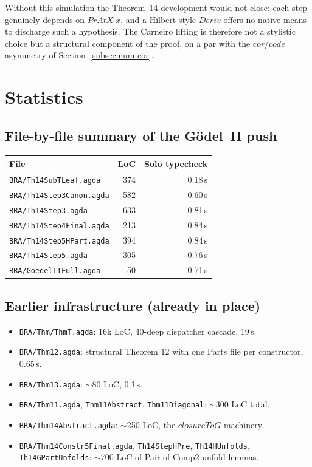 \documentclass[11pt]{article}
\begin{document}
Without this simulation the Theorem~14 development would not close:
each step genuinely depends on $\mathit{PrAtX}\;x$, and a Hilbert-style
$\mathit{Deriv}$ offers no native means to discharge such a hypothesis.
The Carneiro lifting is therefore not a stylistic choice but a
structural component of the proof, on a par with the
$\mathit{cor}$/$\mathit{code}$ asymmetry of
Section~\ref{subsec:num-cor}.

\section{Statistics}

\subsection{File-by-file summary of the G\"odel~II push}

\begin{center}
\begin{tabular}{lrr}
\hline
\textbf{File} & \textbf{LoC} & \textbf{Solo typecheck} \\
\hline
\verb|BRA/Th14SubTLeaf.agda|       & 374 & 0.18\,s \\
\verb|BRA/Th14Step3Canon.agda|     & 582 & 0.60\,s \\
\verb|BRA/Th14Step3.agda|          & 633 & 0.81\,s \\
\verb|BRA/Th14Step4Final.agda|     & 213 & 0.84\,s \\
\verb|BRA/Th14Step5HPart.agda|     & 394 & 0.84\,s \\
\verb|BRA/Th14Step5.agda|          & 305 & 0.76\,s \\
\verb|BRA/GoedelIIFull.agda|       & ~50 & 0.71\,s \\
\hline
\end{tabular}
\end{center}

\subsection{Earlier infrastructure (already in place)}

\begin{itemize}
  \item \verb|BRA/Thm/ThmT.agda|: 16k LoC, 40-deep dispatcher cascade, 19\,s.
  \item \verb|BRA/Thm12.agda|: structural Theorem 12 with one Parts file per constructor, 0.65\,s.
  \item \verb|BRA/Thm13.agda|: $\sim$80 LoC, 0.1\,s.
  \item \verb|BRA/Thm11.agda|, \verb|Thm11Abstract|, \verb|Thm11Diagonal|: $\sim$300 LoC total.
  \item \verb|BRA/Thm14Abstract.agda|: $\sim$250 LoC, the $\mathit{closureToG}$ machinery.
  \item \verb|BRA/Thm14Constr5Final.agda|, \verb|Th14StepHPre|, \verb|Th14HUnfolds|, \verb|Th14GPartUnfolds|: $\sim$700 LoC of Pair-of-Comp2 unfold lemmas.
\end{itemize}
\end{document}
